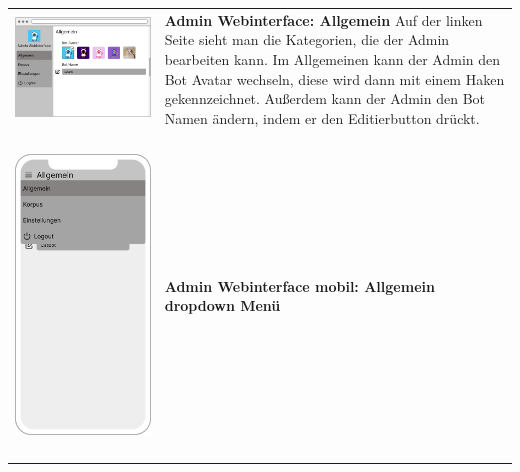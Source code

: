 \begin{tabular}{C{6cm}  L{7cm}}
    \includegraphics[width=\linewidth]{bilder/new vers. UI Design/Allgemein/Allgemein.png}                         & \textbf{Admin Webinterface: Allgemein} \newline
    Auf der linken Seite sieht man die Kategorien, die der Admin bearbeiten kann. Im Allgemeinen kann
    der Admin den Bot Avatar wechseln, diese wird dann mit einem Haken gekennzeichnet. Außerdem kann
    der Admin den Bot Namen ändern, indem er den Editierbutton drückt.                                                                                                                   \\
    \includegraphics[width=5cm,height=8.5cm]{bilder/new vers. UI Design/Allgemein/iPhone X Allgemein dropdown.png} & \textbf{Admin Webinterface mobil: Allgemein dropdown Menü} \newline

\end{tabular}
